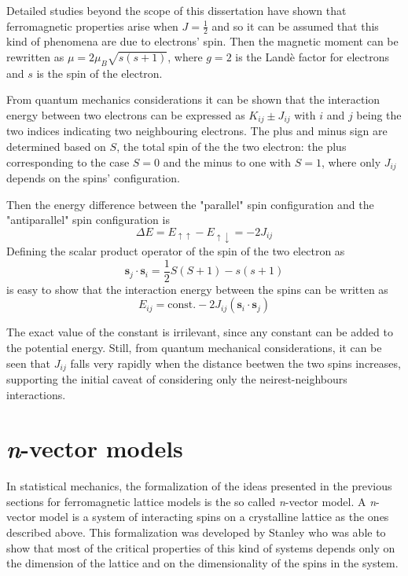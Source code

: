 Detailed studies beyond the scope of this dissertation have shown that ferromagnetic
properties arise when $J=\frac{1}{2}$ and so it can be assumed that this kind of 
phenomena are due to electrons' spin. Then the magnetic moment can be rewritten as 
$\mu = 2 \mu_B \sqrt{s(s+1)}$, where $g=2$ is the Landè factor for electrons and
$s$ is the spin of the electron.

From quantum mechanics considerations \parencite[see][]{bransden2003physics}
it can be shown that the interaction energy between two electrons can be expressed
as $K_{ij} \pm J_{ij}$ with $i$ and $j$ being the two indices indicating two
neighbouring electrons. The plus and minus sign are determined based on $S$, the 
total spin of the the two electron: the plus corresponding to the case $S=0$ and 
the minus to one with $S=1$, where only $J_{ij}$ depends on the spins' configuration.

Then the energy difference between the "parallel" spin configuration and the 
"antiparallel" spin configuration is
$$\Delta E = E_{\uparrow\uparrow} - E_{\uparrow\downarrow} = -2J_{ij}$$
Defining the scalar product operator of the spin of the two electron as 
$$ \mathbf{s}_j \cdot \mathbf{s}_i = \frac{1}{2} S(S+1) - s(s+1)$$
is easy to show that the interaction energy between the spins can be written as
$$ E_{ij} = \text{const.} - 2J_{ij} (\mathbf{s}_i \cdot \mathbf{s}_j)$$

The exact value of the constant is irrilevant, since any constant can be added to
the potential energy. Still, from quantum mechanical considerations, it can be seen
that $J_{ij}$ falls very rapidly when the distance beetwen the two spins increases,
supporting the initial caveat of considering only the neirest-neighbours interactions.


\section{\textit{n}-vector models}

In statistical mechanics, the formalization of the ideas presented in the previous
sections for ferromagnetic lattice models is the so called \textit{n}-vector model.
A \textit{n}-vector model is a system of interacting spins on a crystalline lattice 
as the ones described above. This formalization was developed by Stanley
\parencite[see][]{PhysRevLett.20.589} who was able to show that most of the
critical properties of this kind of systems depends only on the dimension of the
lattice and on the dimensionality of the spins in the system.

